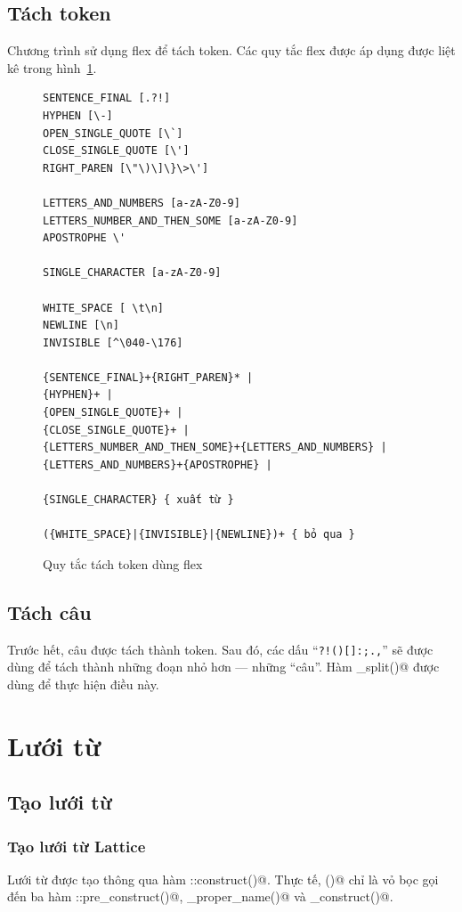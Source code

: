 \documentclass[a4paper,oneside,14pt]{extbook} %
\begin{document}
\subsection{Tách token}
\label{sub:preprocess:token}

Chương trình sử dụng flex để tách token. Các quy tắc flex được áp dụng
được liệt kê trong hình~\ref{fig:flex-token}.
\begin{figure}[htbp]
  \centering
\begin{verbatim}
SENTENCE_FINAL [.?!]
HYPHEN [\-]
OPEN_SINGLE_QUOTE [\`]
CLOSE_SINGLE_QUOTE [\']
RIGHT_PAREN [\"\)\]\}\>\']

LETTERS_AND_NUMBERS [a-zA-Z0-9]
LETTERS_NUMBER_AND_THEN_SOME [a-zA-Z0-9]
APOSTROPHE \'

SINGLE_CHARACTER [a-zA-Z0-9]

WHITE_SPACE [ \t\n]
NEWLINE [\n]
INVISIBLE [^\040-\176]

{SENTENCE_FINAL}+{RIGHT_PAREN}* |
{HYPHEN}+ |
{OPEN_SINGLE_QUOTE}+ |
{CLOSE_SINGLE_QUOTE}+ |
{LETTERS_NUMBER_AND_THEN_SOME}+{LETTERS_AND_NUMBERS} |
{LETTERS_AND_NUMBERS}+{APOSTROPHE} |

{SINGLE_CHARACTER} { xuất từ }

({WHITE_SPACE}|{INVISIBLE}|{NEWLINE})+ { bỏ qua }
\end{verbatim}
  
  \caption{Quy tắc tách token dùng flex}
  \label{fig:flex-token}
\end{figure}


\subsection{Tách câu}

Trước hết, câu được tách thành token. Sau đó, các dấu ``\texttt{?!()[]:;.,}''
sẽ được dùng để tách thành những đoạn nhỏ hơn --- những ``câu''. Hàm
\verb@sentences_split()@ được dùng để thực hiện điều này.

\section{Lưới từ}

\subsection{Tạo lưới từ}
\subsubsection{Tạo lưới từ Lattice}
Lưới từ \verb@Lattice@ được tạo thông qua hàm
\verb@Lattice::construct()@. Thực tế, \verb@construct()@ chỉ là vỏ bọc
gọi đến ba hàm \verb@Lattice::pre_construct()@,
\verb@mark_proper_name()@ và \verb@post_construct()@.
\end{document}
